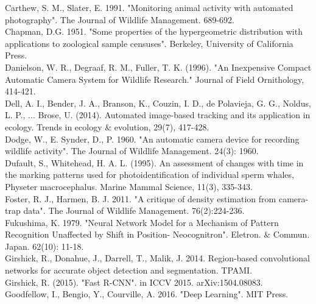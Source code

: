 \documentclass[11pt]{article}
\begin{document}
Carthew, S. M., Slater, E. 1991. "Monitoring animal activity with automated photography". The Journal of Wildlife Management. 689-692.
\newline
\\
Chapman, D.G. 1951. "Some properties of the hypergeometric distribution with applications to zoological sample censuses". Berkeley, University of California Press.
\newline
\\
Danielson, W. R., Degraaf, R. M., Fuller, T. K. (1996). "An Inexpensive Compact Automatic Camera System for Wildlife Research." Journal of Field Ornithology, 414-421.
\newline
\\
Dell, A. I., Bender, J. A., Branson, K., Couzin, I. D., de Polavieja, G. G., Noldus, L. P., ... Brose, U. (2014). Automated image-based tracking and its application in ecology. Trends in ecology \& evolution, 29(7), 417-428.
\newline
\\
Dodge, W., E. Synder, D., P. 1960. "An automatic camera device for recording wildlife activity". The Journal of Wildlife Management. 24(3): 1960.
\newline
\\
Dufault, S., Whitehead, H. A. L. (1995). An assessment of changes with time in the marking patterns used for photoidentification of individual sperm whales, Physeter macrocephalus. Marine Mammal Science, 11(3), 335-343.
\newline
\\
Foster, R. J., Harmen, B. J. 2011. "A critique of density estimation from camera-trap data". The Journal of Wildlife Management. 76(2):224-236.
\newline
\\
Fukushima, K. 1979. "Neural Network Model for a Mechanism of Pattern Recognition Unaffected by Shift in Position- Neocognitron". Eletron. \& Commun. Japan. 62(10): 11-18.
\newline
\\
Girshick, R., Donahue, J., Darrell, T., Malik, J. 2014. Region-based convolutional networks for accurate object detection and segmentation. TPAMI.
\newline
\\
Girshick, R. (2015). "Fast R-CNN". in ICCV 2015. arXiv:1504.08083.
\newline
\\
Goodfellow, I., Bengio, Y., Courville, A. 2016. "Deep Learning". MIT Press.
\newline
\end{document}
